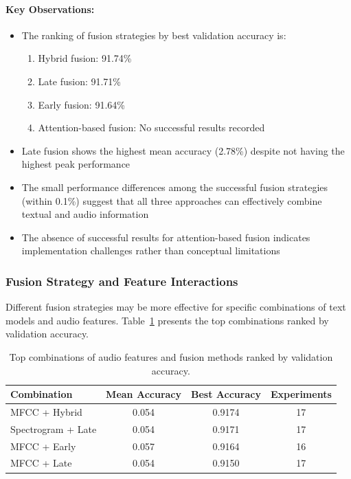 \documentclass[12pt]{article}
\begin{document}
\paragraph{Key Observations:}
\begin{itemize}
    \item The ranking of fusion strategies by best validation accuracy is:
    \begin{enumerate}
        \item Hybrid fusion: 91.74\%
        \item Late fusion: 91.71\%
        \item Early fusion: 91.64\%
        \item Attention-based fusion: No successful results recorded
    \end{enumerate}
    
    \item Late fusion shows the highest mean accuracy (2.78\%) despite not having the highest peak performance
    
    \item The small performance differences among the successful fusion strategies (within 0.1\%) suggest that all three approaches can effectively combine textual and audio information
    
    \item The absence of successful results for attention-based fusion indicates implementation challenges rather than conceptual limitations
\end{itemize}

\subsubsection{Fusion Strategy and Feature Interactions}
Different fusion strategies may be more effective for specific combinations of text models and audio features. Table~\ref{tab:feature_fusion_combinations} presents the top combinations ranked by validation accuracy.

\begin{table}[h]
\centering
\caption{Top combinations of audio features and fusion methods ranked by validation accuracy.}
\label{tab:feature_fusion_combinations}
\begin{tabular}{|l|c|c|c|}
\hline
\textbf{Combination} & \textbf{Mean Accuracy} & \textbf{Best Accuracy} & \textbf{Experiments} \\
\hline
MFCC + Hybrid & 0.054 & 0.9174 & 17 \\
\hline
Spectrogram + Late & 0.054 & 0.9171 & 17 \\
\hline
MFCC + Early & 0.057 & 0.9164 & 16 \\
\hline
MFCC + Late & 0.054 & 0.9150 & 17 \\
\hline
\end{tabular}
\end{table}
\end{document}

